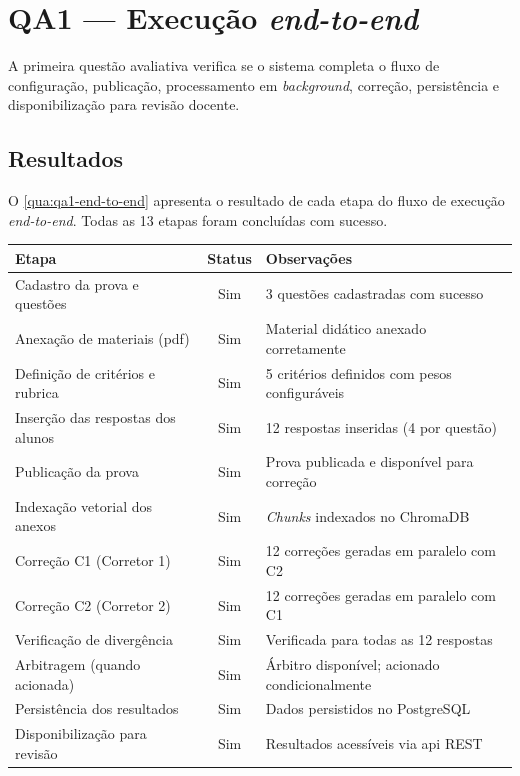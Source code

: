 \section{QA1 --- Execução \textit{end-to-end}}
\label{sec:qa1}

A primeira questão avaliativa verifica se o sistema completa o fluxo de configuração, publicação, processamento em \textit{background}, correção, persistência e disponibilização para revisão docente.

\subsection{Resultados}

O \autoref{qua:qa1-end-to-end} apresenta o resultado de cada etapa do fluxo de execução \textit{end-to-end}. Todas as 13 etapas foram concluídas com sucesso.

\begin{quadro}[H]
    \centering
    \caption{Verificação de execução \textit{end-to-end} do sistema}
    \label{qua:qa1-end-to-end}
    {\small
    \begin{tabularx}{\textwidth}{|p{}|c|X|}
        \hline
        \textbf{Etapa} & \textbf{Status} & \textbf{Observações} \\
        \hline
        Cadastro da prova e questões & Sim & 3 questões cadastradas com sucesso \\
        \hline
        Anexação de materiais (\gls{pdf}) & Sim & Material didático anexado corretamente \\
        \hline
        Definição de critérios e rubrica & Sim & 5 critérios definidos com pesos configuráveis \\
        \hline
        Inserção das respostas dos alunos & Sim & 12 respostas inseridas (4 por questão) \\
        \hline
        Publicação da prova & Sim & Prova publicada e disponível para correção \\
        \hline
        Indexação vetorial dos anexos & Sim & \textit{Chunks} indexados no ChromaDB \\
        \hline
        Correção C1 (Corretor 1) & Sim & 12 correções geradas em paralelo com C2 \\
        \hline
        Correção C2 (Corretor 2) & Sim & 12 correções geradas em paralelo com C1 \\
        \hline
        Verificação de divergência & Sim & Verificada para todas as 12 respostas \\
        \hline
        Arbitragem (quando acionada) & Sim & Árbitro disponível; acionado condicionalmente \\
        \hline
        Persistência dos resultados & Sim & Dados persistidos no PostgreSQL \\
        \hline
        Disponibilização para revisão & Sim & Resultados acessíveis via \gls{api} REST \\
        \hline
    \end{tabularx}
    }
\end{quadro}


